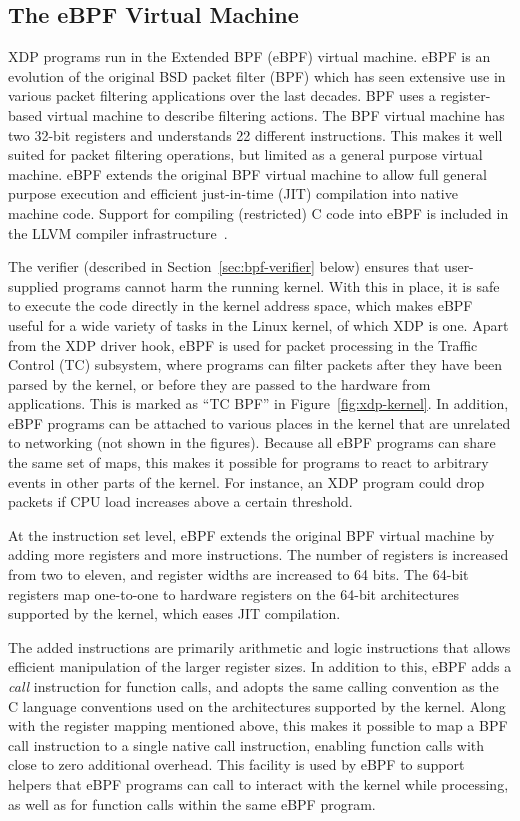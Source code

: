 \documentclass[sigconf]{acmart}
\begin{document}
\subsection{The eBPF Virtual Machine}
\label{sec:bpf-vm}
XDP programs run in the Extended BPF (eBPF) virtual machine. eBPF is an
evolution of the original BSD packet filter (BPF) \cite{mccanne_bsd_1993} which
has seen extensive use in various packet filtering applications over the last
decades. BPF uses a register-based virtual machine to describe filtering
actions. The BPF virtual machine has two 32-bit registers and understands 22
different instructions. This makes it well suited for packet filtering
operations, but limited as a general purpose virtual machine. eBPF extends the
original BPF virtual machine to allow full general purpose execution and
efficient just-in-time (JIT) compilation into native machine code. Support for
compiling (restricted) C code into eBPF is included in the LLVM compiler
infrastructure~\cite{llvm}.

The verifier (described in Section~\ref{sec:bpf-verifier} below) ensures that
user-supplied programs cannot harm the running kernel. With this in place, it is
safe to execute the code directly in the kernel address space, which makes eBPF
useful for a wide variety of tasks in the Linux kernel, of which XDP is one.
Apart from the XDP driver hook, eBPF is used for packet processing in the
Traffic Control (TC) subsystem, where programs can filter packets after they
have been parsed by the kernel, or before they are passed to the hardware from
applications. This is marked as ``TC BPF'' in Figure~\ref{fig:xdp-kernel}. In
addition, eBPF programs can be attached to various places in the kernel that are
unrelated to networking (not shown in the figures). Because all eBPF programs
can share the same set of maps, this makes it possible for programs to react to
arbitrary events in other parts of the kernel. For instance, an XDP program
could drop packets if CPU load increases above a certain threshold.

At the instruction set level, eBPF extends the original BPF virtual machine by
adding more registers and more instructions. The number of registers is
increased from two to eleven, and register widths are increased to 64 bits. The
64-bit registers map one-to-one to hardware registers on the 64-bit
architectures supported by the kernel, which eases JIT compilation.

The added instructions are primarily arithmetic and logic instructions that
allows efficient manipulation of the larger register sizes. In addition to this,
eBPF adds a \emph{call} instruction for function calls, and adopts the same
calling convention as the C language conventions used on the architectures
supported by the kernel. Along with the register mapping mentioned above, this
makes it possible to map a BPF call instruction to a single native call
instruction, enabling function calls with close to zero additional overhead.
This facility is used by eBPF to support helpers that eBPF programs can call to
interact with the kernel while processing, as well as for function calls within
the same eBPF program.
\end{document}
